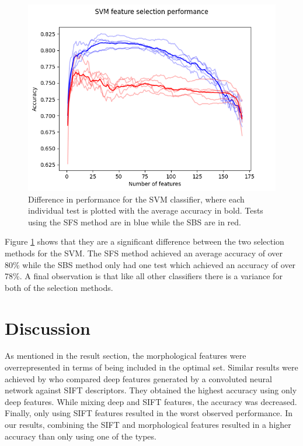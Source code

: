 \documentclass{kththesis}
\begin{document}
\begin{figure}[h!]
  \begin{center}
    \includegraphics[scale=0.8]{../new_plots/svm_graph.png}
    \caption{Difference in performance for the SVM classifier, where each individual test is plotted with the average accuracy in bold. Tests using the SFS method are in blue while the SBS are in red.}
    \label{fig:svm}
  \end{center}
\end{figure}

Figure \ref{fig:svm} shows that they are a significant difference between the two selection methods for the SVM. The SFS method achieved an average accuracy of over 80\% while the SBS method only had one test which achieved an accuracy of over 78\%. A final observation is that like all other classifiers there is a variance for both of the selection methods.

\chapter{Discussion}

As mentioned in the result section, the morphological features were overrepresented in terms of being included in the optimal set. Similar results were achieved by \parencite{Zhang}
who compared deep features generated by a convoluted neural network against SIFT descriptors. They obtained the highest accuracy using only deep features. While mixing deep and SIFT features, the accuracy was decreased. Finally, only using SIFT features resulted in the worst observed performance. In our results, combining the SIFT and morphological features resulted in a higher accuracy than only using one of the types.
\end{document}
